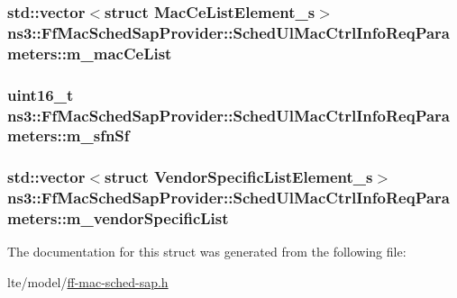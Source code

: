\subsubsection[{\texorpdfstring{m\+\_\+mac\+Ce\+List}{m_macCeList}}]{\setlength{\rightskip}{0pt plus 5cm}std\+::vector$<$struct {\bf Mac\+Ce\+List\+Element\+\_\+s}$>$ ns3\+::\+Ff\+Mac\+Sched\+Sap\+Provider\+::\+Sched\+Ul\+Mac\+Ctrl\+Info\+Req\+Parameters\+::m\+\_\+mac\+Ce\+List}\hypertarget{structns3_1_1FfMacSchedSapProvider_1_1SchedUlMacCtrlInfoReqParameters_aeb2a3532424914d92b3c31b08b297149}{}\label{structns3_1_1FfMacSchedSapProvider_1_1SchedUlMacCtrlInfoReqParameters_aeb2a3532424914d92b3c31b08b297149}
\subsubsection[{\texorpdfstring{m\+\_\+sfn\+Sf}{m_sfnSf}}]{\setlength{\rightskip}{0pt plus 5cm}uint16\+\_\+t ns3\+::\+Ff\+Mac\+Sched\+Sap\+Provider\+::\+Sched\+Ul\+Mac\+Ctrl\+Info\+Req\+Parameters\+::m\+\_\+sfn\+Sf}\hypertarget{structns3_1_1FfMacSchedSapProvider_1_1SchedUlMacCtrlInfoReqParameters_a89dd0c663b8e031e46e849680a5bef55}{}\label{structns3_1_1FfMacSchedSapProvider_1_1SchedUlMacCtrlInfoReqParameters_a89dd0c663b8e031e46e849680a5bef55}
\subsubsection[{\texorpdfstring{m\+\_\+vendor\+Specific\+List}{m_vendorSpecificList}}]{\setlength{\rightskip}{0pt plus 5cm}std\+::vector$<$struct {\bf Vendor\+Specific\+List\+Element\+\_\+s}$>$ ns3\+::\+Ff\+Mac\+Sched\+Sap\+Provider\+::\+Sched\+Ul\+Mac\+Ctrl\+Info\+Req\+Parameters\+::m\+\_\+vendor\+Specific\+List}\hypertarget{structns3_1_1FfMacSchedSapProvider_1_1SchedUlMacCtrlInfoReqParameters_a9f583d496dc2ef0a4eb805d55233fc7e}{}\label{structns3_1_1FfMacSchedSapProvider_1_1SchedUlMacCtrlInfoReqParameters_a9f583d496dc2ef0a4eb805d55233fc7e}


The documentation for this struct was generated from the following file\+:\begin{DoxyCompactItemize}
\item 
lte/model/\hyperlink{ff-mac-sched-sap_8h}{ff-\/mac-\/sched-\/sap.\+h}\end{DoxyCompactItemize}
